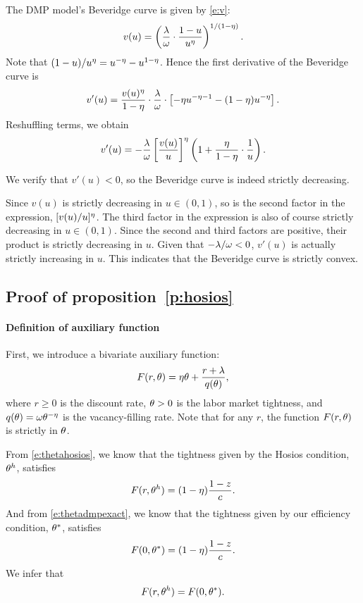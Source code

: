 \documentclass[letterpaper,12pt,leqno]{article}
\begin{document}
The DMP model's Beveridge curve is given by \eqref{e:v}:
\begin{equation*}
v(u) = \left( \frac{\lambda}{\omega}\cdot\frac{1-u}{u^{\eta}} \right)^{1/(1-\eta)}.
\end{equation*}
Note that $(1-u)/u^{\eta} = u^{-\eta}-u^{1-\eta}$. Hence the first derivative of the Beveridge curve is
\begin{equation*}
v'(u)= \frac{v(u)^{\eta}}{1-\eta} \cdot \frac{\lambda}{\omega} \cdot \left[ -\eta u^{-\eta-1}-(1-\eta) u^{-\eta} \right].
\end{equation*}
Reshuffling terms, we obtain
\begin{equation*}
v'(u) = -\frac{\lambda}{\omega} \left[ \frac{v(u)}{u} \right]^{\eta}\left( 1+\frac{\eta}{1-\eta}\cdot\frac{1}{u} \right).
\end{equation*}

We verify that $v'(u)<0$, so the Beveridge curve is indeed strictly decreasing. 

Since $v(u)$ is strictly decreasing in $u\in(0,1)$, so is the second factor in the expression, $[v(u)/u]^{\eta}$. The third factor in the expression is also of course strictly decreasing in $u\in(0,1)$. Since the second and third factors are positive, their product is strictly decreasing in $u$. Given that $-\lambda/\omega<0$, $v'(u)$ is actually strictly increasing in $u$. This indicates that the Beveridge curve is strictly convex.

\subsection{Proof of proposition~\ref{p:hosios}}

\paragraph{Definition of auxiliary function} First, we introduce a bivariate auxiliary function:
\begin{equation}
F(r,\theta) = \eta\theta + \frac{r+\lambda}{q(\theta)},
\label{e:F}\end{equation}
where $r\geq 0$ is the discount rate, $\theta>0$ is the labor market tightness, and $q(\theta) = \omega \theta^{-\eta}$ is the vacancy-filling rate. Note that for any $r$, the function $F(r,\theta)$ is strictly in $\theta$.

From \eqref{e:thetahosios}, we know that the tightness given by the Hosios condition, $\theta^h$, satisfies
\begin{equation*}
F(r,\theta^h) = (1-\eta)\frac{1-z}{c}.
\end{equation*}
And from \eqref{e:thetadmpexact}, we know that the tightness given by our efficiency condition, $\theta^*$, satisfies
\begin{equation*}
F(0,\theta^*) = (1-\eta)\frac{1-z}{c}.
\end{equation*}
We infer that 
\begin{equation}
F(r,\theta^h) = F(0,\theta^*).
\label{e:FF}\end{equation}
\end{document}
